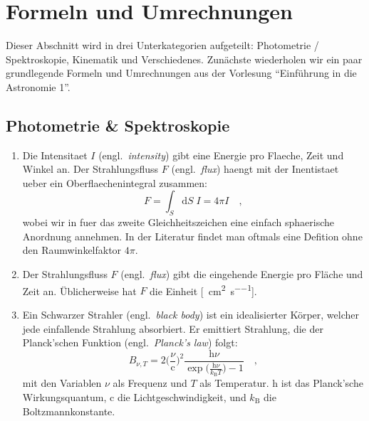 \clearpage
\section{Formeln und Umrechnungen}
\label{sec:formeln_und_umrechnungen}

Dieser Abschnitt wird in drei Unterkategorien aufgeteilt: Photometrie / Spektroskopie, Kinematik und Verschiedenes.
Zunächste wiederholen wir ein paar grundlegende Formeln und Umrechnungen aus der Vorlesung ``Einführung in die Astronomie 1''.


\subsection{Photometrie \& Spektroskopie}
\label{subsec:photometrie_und_spektroskopie}

\begin{enumerate}[label=$\smalltriangleright$]
  \item
  Die Intensitaet $I$ (engl.\ \textit{intensity}) gibt eine Energie pro Flaeche, Zeit und Winkel an.
  Der Strahlungsfluss $F$ (engl.\ \textit{flux}) haengt mit der Inentistaet ueber ein Oberflaechenintegral zusammen:
  \begin{equation}
    F = \int_{S} \mathrm{d}S \; I = 4\pi I \quad ,
  \end{equation}
  wobei wir in fuer das zweite Gleichheitszeichen eine einfach sphaerische Anordnung annehmen.
  In der Literatur findet man oftmals eine Defition ohne den Raumwinkelfaktor $4\pi$.


  \item
  Der Strahlungsfluss $F$ (engl.\ \textit{flux}) gibt die eingehende Energie pro Fläche und Zeit an.
  Üblicherweise hat $F$ die Einheit [\si{\erg\per\centi\metre\squared\per\second}].


  \item
  Ein Schwarzer Strahler (engl.\ \textit{black body}) ist ein idealisierter Körper, welcher jede einfallende Strahlung absorbiert.
  Er emittiert Strahlung, die der Planck'schen Funktion (engl.\ \textit{Planck's law}) folgt:
  \begin{equation}
    B_{\nu, T} = 2 \Big( \frac{\nu}{\mathrm{c}} \Big)^{2} \frac{\mathrm{h}\nu}{\exp \big( \frac{\mathrm{h}\nu}{k_{\mathrm{B}} T} \big) - 1} \quad,
  \end{equation}
  mit den Variablen $\nu$ als Frequenz und $T$ als Temperatur.
  $\mathrm{h}$ ist das Planck'sche Wirkungsquantum, $\mathrm{c}$ die Lichtgeschwindigkeit, und $k_{\mathrm{B}}$ die Boltzmannkonstante.



\end{enumerate}
